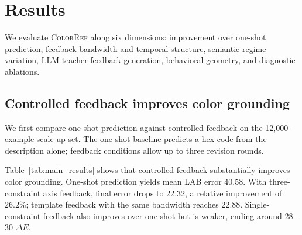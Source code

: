 \documentclass[11pt]{article}
\begin{document}
\section{Results}
\label{sec:results}

We evaluate \textsc{ColorRef} along six dimensions: improvement over one-shot
prediction, feedback bandwidth and temporal structure, semantic-regime
variation, LLM-teacher feedback generation, behavioral geometry, and
diagnostic ablations.

\subsection{Controlled feedback improves color grounding}
\label{sec:results_main}

We first compare one-shot prediction against controlled feedback on the
12{,}000-example scale-up set. The one-shot baseline predicts a hex code
from the description alone; feedback conditions allow up to three revision
rounds.

\begin{table}[t]
\centering
\small
{}
\caption{Main 12k results for Qwen3-14B. Controlled feedback substantially
reduces LAB error relative to one-shot prediction.}
\label{tab:main_results}
\end{table}

Table~\ref{tab:main_results} shows that controlled feedback substantially
improves color grounding. One-shot prediction yields mean LAB error 40.58.
With three-constraint axis feedback, final error drops to 22.32, a relative
improvement of 26.2\%; template feedback with the same bandwidth reaches
22.88. Single-constraint feedback also improves over one-shot but is weaker,
ending around 28--30 $\Delta E$.
\end{document}
